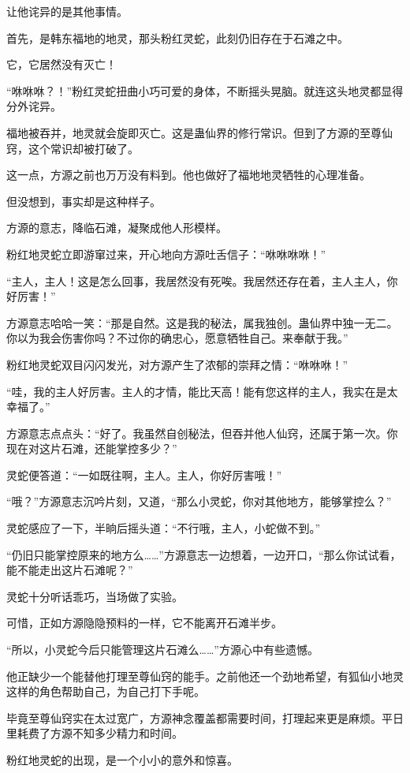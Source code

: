 \begin{this_body}
让他诧异的是其他事情。

首先，是韩东福地的地灵，那头粉红灵蛇，此刻仍旧存在于石滩之中。

它，它居然没有灭亡！

“咻咻咻？！”粉红灵蛇扭曲小巧可爱的身体，不断摇头晃脑。就连这头地灵都显得分外诧异。

福地被吞并，地灵就会旋即灭亡。这是蛊仙界的修行常识。但到了方源的至尊仙窍，这个常识却被打破了。

这一点，方源之前也万万没有料到。他也做好了福地地灵牺牲的心理准备。

但没想到，事实却是这种样子。

方源的意志，降临石滩，凝聚成他人形模样。

粉红地灵蛇立即游窜过来，开心地向方源吐舌信子：“咻咻咻咻！”

“主人，主人！这是怎么回事，我居然没有死唉。我居然还存在着，主人主人，你好厉害！”

方源意志哈哈一笑：“那是自然。这是我的秘法，属我独创。蛊仙界中独一无二。你以为我会伤害你吗？不过你的确忠心，愿意牺牲自己。来奉献于我。”

粉红地灵蛇双目闪闪发光，对方源产生了浓郁的崇拜之情：“咻咻咻！”

“哇，我的主人好厉害。主人的才情，能比天高！能有您这样的主人，我实在是太幸福了。”

方源意志点点头：“好了。我虽然自创秘法，但吞并他人仙窍，还属于第一次。你现在对这片石滩，还能掌控多少？”

灵蛇便答道：“一如既往啊，主人。主人，你好厉害哦！”

“哦？”方源意志沉吟片刻，又道，“那么小灵蛇，你对其他地方，能够掌控么？”

灵蛇感应了一下，半晌后摇头道：“不行哦，主人，小蛇做不到。”

“仍旧只能掌控原来的地方么……”方源意志一边想着，一边开口，“那么你试试看，能不能走出这片石滩呢？”

灵蛇十分听话乖巧，当场做了实验。

可惜，正如方源隐隐预料的一样，它不能离开石滩半步。

“所以，小灵蛇今后只能管理这片石滩么……”方源心中有些遗憾。

他正缺少一个能替他打理至尊仙窍的能手。之前他还一个劲地希望，有狐仙小地灵这样的角色帮助自己，为自己打下手呢。

毕竟至尊仙窍实在太过宽广，方源神念覆盖都需要时间，打理起来更是麻烦。平日里耗费了方源不知多少精力和时间。

粉红地灵蛇的出现，是一个小小的意外和惊喜。


\end{this_body}
